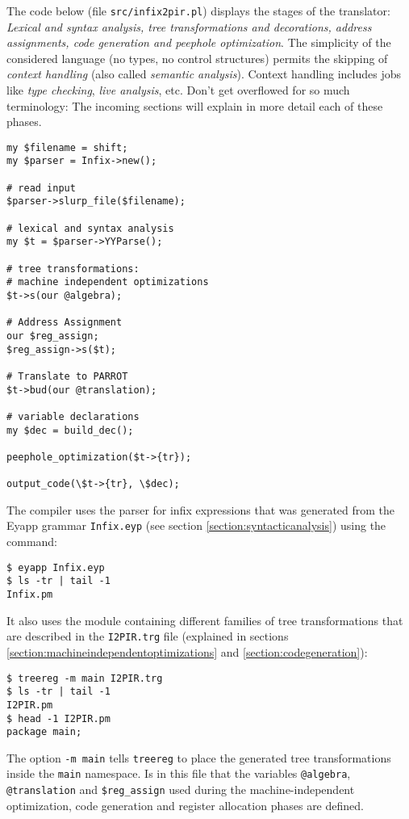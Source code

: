 The code below 
(file \verb|src/infix2pir.pl|) %
displays
the stages of the translator: \emph{Lexical
and syntax analysis, tree transformations
and decorations,
address assignments, code generation
and peephole optimization}. The simplicity of the 
considered language (no types, no control structures) 
permits the skipping of 
\emph{context handling} (also called \emph{semantic analysis}).
Context handling includes jobs like \emph{type checking}, 
\emph{live analysis}, etc.
Don't get overflowed for so much terminology:
The incoming sections will
explain in more detail each of these phases.
\begin{verbatim}
my $filename = shift;
my $parser = Infix->new(); 

# read input
$parser->slurp_file($filename);

# lexical and syntax analysis
my $t = $parser->YYParse();

# tree transformations:
# machine independent optimizations
$t->s(our @algebra);  

# Address Assignment 
our $reg_assign;
$reg_assign->s($t);

# Translate to PARROT
$t->bud(our @translation);

# variable declarations
my $dec = build_dec();

peephole_optimization($t->{tr});

output_code(\$t->{tr}, \$dec);
\end{verbatim}

The compiler uses the parser for infix expressions
that was generated from the Eyapp grammar  \verb|Infix.eyp|
(see section \ref{section:syntacticanalysis})
using the command:
\begin{verbatim}
$ eyapp Infix.eyp
$ ls -tr | tail -1
Infix.pm
\end{verbatim}
It also uses the module containing different families of tree
transformations that are described in the \verb|I2PIR.trg| file 
(explained in 
sections \ref{section:machineindependentoptimizations} and \ref{section:codegeneration}): 
\begin{verbatim}
$ treereg -m main I2PIR.trg
$ ls -tr | tail -1
I2PIR.pm
$ head -1 I2PIR.pm
package main;
\end{verbatim}
The option \verb|-m main| tells \verb|treereg|
to place the generated tree transformations inside the \verb|main|
namespace. Is in this file that the variables 
\verb|@algebra|, \verb|@translation| and 
\verb|$reg_assign| used during the machine-independent optimization,
code generation and register allocation phases are defined.


